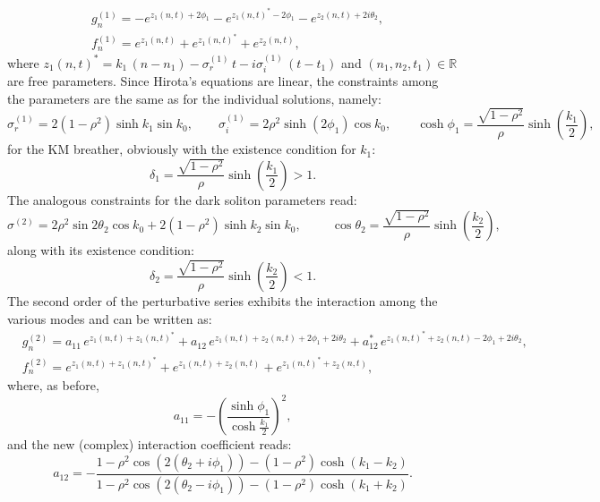 \documentclass{article}
\def\RR{\mathbb R}
\begin{document}
\begin{equation}
\begin{split}
   & g^{(1)}_n=-e^{z_1(n,t)+2\phi_1}-e^{z_1(n,t)^*-2\phi_1}-e^{z_2(n,t)+2i\theta_2}, \\
   & f^{(1)}_n=e^{z_1(n,t)}+e^{z_1(n,t)^*}+e^{z_2(n,t)},
    \end{split}
\end{equation}
where $z_1(n,t)^*=k_1\,(n-n_1)-\sigma_r^{(1)}\,t-i\sigma_i^{(1)}\,(t-t_1)$ and $(n_1,n_2,t_1)\in\RR$ are free parameters. Since Hirota's equations are linear, the constraints among the parameters are the same as for the individual solutions, namely:
\begin{equation}
    \sigma_r^{(1)}=2(1-\rho^2)\sinh k_1\sin k_0, \qquad \sigma_i^{(1)}=2\rho^2\sinh(2\phi_1)\cos k_0, \qquad  \cosh\phi_1= \frac{  \sqrt{1-\rho^2}}{\rho}\sinh\left(\frac{k_1}{2}\right),
\end{equation}
for the KM breather, obviously with the existence condition for $k_1$: 
$$
\delta_1=\frac{  \sqrt{1-\rho^2}}{\rho}\sinh\left(\frac{k_1}{2}\right)>1.
$$
The analogous constraints for the dark soliton parameters read:
\begin{equation}
     \sigma^{(2)}= 2\rho^2\sin 2\theta_2\cos k_0+2(1-\rho^2)\sinh k_2\sin k_0,\hspace{1cm} \cos\theta_2= \frac{  \sqrt{1-\rho^2}}{\rho}\sinh\left(\frac{k_2}{2}\right),
\end{equation}
along with its existence condition: 
$$
\delta_2=\frac{  \sqrt{1-\rho^2}}{\rho}\sinh\left(\frac{k_2}{2}\right)<1.
$$
The second order of the perturbative series exhibits the interaction among the various modes and can be written as:\\
\begin{equation}
 \begin{split}
   & g^{(2)}_n=a_{11}\,e^{z_1(n,t)+z_1(n,t)^*}+a_{12}\,e^{z_1(n,t)+z_2(n,t)+2\phi_1+2i\theta_2}+a_{12}^*\,e^{z_1(n,t)^*+z_2(n,t)-2\phi_1+2i\theta_2}, \\
   & f^{(2)}_n=e^{z_1(n,t)+z_1(n,t)^*}+e^{z_1(n,t)+z_2(n,t)}+e^{z_1(n,t)^*+z_2(n,t)},
    \end{split}   
\end{equation}
where, as before, 
$$
a_{11}=-\left(\frac{\sinh\phi_1}{\cosh\frac{k_1}{2}}\right)^2,
$$
and the new (complex) interaction coefficient reads:
\begin{equation}\label{a12}
    a_{12}=-\frac{1-\rho^2\cos(2(\theta_2+i\phi_1))-(1-\rho^2)\cosh(k_1-k_2)}{1-\rho^2\cos (2(\theta_2-i\phi_1))-(1-\rho^2)\cosh(k_1+k_2)}.
\end{equation}\\
\end{document}
